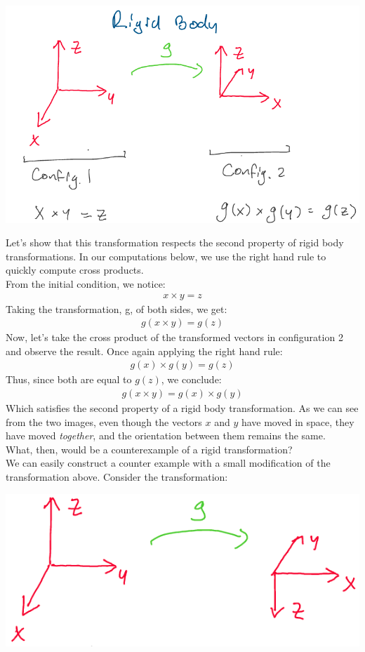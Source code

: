 \documentclass[oneside]{book}
\begin{document}
\begin{center}
    \includegraphics[scale=0.35]{images/rigidorient.png}\\
\end{center}
Let's show that this transformation respects the second property of rigid body transformations. In our computations below, we use the right hand rule to quickly compute cross products.\\
From the initial condition, we notice:
\begin{align}
    x\times y = z
\end{align}
Taking the transformation, g, of both sides, we get:
\begin{align}
    g(x\times y) = g(z)
\end{align}
Now, let's take the cross product of the transformed vectors in configuration 2 and observe the result. Once again applying the right hand rule:
\begin{align}
    g(x) \times g(y) = g(z)
\end{align}
Thus, since both are equal to $g(z)$, we conclude:
\begin{align}
    g(x\times y) = g(x) \times g(y)
\end{align}
Which satisfies the second property of a rigid body transformation. As we can see from the two images, even though the vectors $x$ and $y$ have moved in space, they have moved \textit{together}, and the orientation between them remains the same.\\
What, then, would be a counterexample of a rigid transformation?\\
We can easily construct a counter example with a small modification of the transformation above. Consider the transformation:
\begin{center}
    \includegraphics[scale=0.35]{images/counterexrot.png}\\
\end{center}
\end{document}
